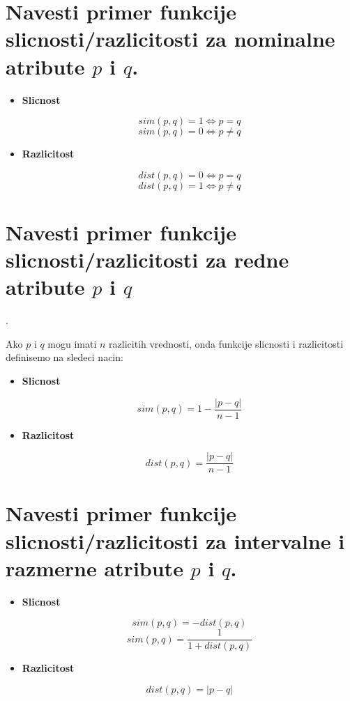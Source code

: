 \documentclass[a4paper]{article}
\begin{document}
\section{Navesti primer funkcije slicnosti/razlicitosti za nominalne atribute \(p\) i \(q\).}

\begin{itemize}
\item \textbf{Slicnost}

\[sim(p, q) = 1 \iff p = q\]
\[sim(p, q) = 0 \iff p \neq q\]

\item \textbf{Razlicitost}

\[dist(p, q) = 0 \iff p = q\]
\[dist(p, q) = 1 \iff p \neq q\]

\end{itemize}

\section{Navesti primer funkcije slicnosti/razlicitosti za redne atribute \(p\) i \(q\)}.

Ako \(p\) i \(q\) mogu imati \(n\) razlicitih vrednosti, onda funkcije slicnosti i
razlicitosti definisemo na sledeci nacin:

\begin{itemize}
\item \textbf{Slicnost}

\[sim(p, q) = 1 - \dfrac{|p - q|}{n - 1}\]

\item \textbf{Razlicitost}

\[dist(p, q) = \dfrac{|p - q|}{n - 1}\]
\end{itemize}

\section{Navesti primer funkcije slicnosti/razlicitosti za intervalne i razmerne atribute \(p\) i
\(q\).}

\begin{itemize}
\item \textbf{Slicnost}

\[sim(p, q) = -dist(p,q)\]
\[sim(p, q) = \dfrac{1}{1 + dist(p, q)}\]

\item \textbf{Razlicitost}

\[dist(p, q) = |p - q|\]
\end{itemize}
\end{document}
